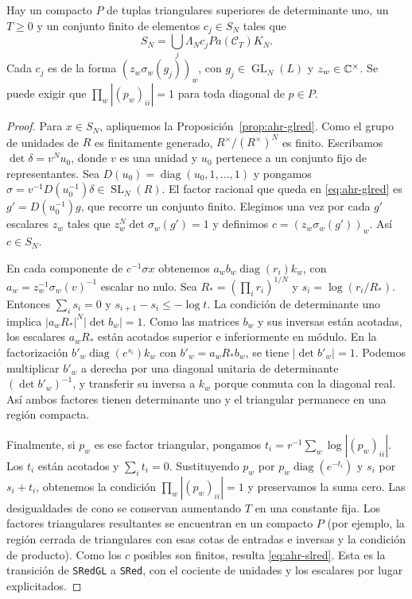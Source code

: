 \begin{proposicion}
\label{prop:ahr-slred}
Hay un compacto $P$ de tuplas triangulares superiores de determinante uno, un $T\ge0$ y un conjunto finito de elementos $c_j\in S_N$ tales que
\begin{equation}
 S_N=\bigcup_j\Lambda_N c_j P a(\mathcal C_T)K_N.
 \label{eq:ahr-slred}
\end{equation}
Cada $c_j$ es de la forma $(z_w\sigma_w(g_j))_w$, con $g_j\in\operatorname{GL}_N(L)$ y $z_w\in\mathbb{C}^\times$. Se puede exigir que $\prod_w|(p_w)_{ii}|=1$ para toda diagonal de $p\in P$.
\end{proposicion}
\begin{proof}
Para $x\in S_N$, apliquemos la Proposición~\ref{prop:ahr-glred}. Como el grupo de unidades de $R$ es finitamente generado, $R^\times/(R^\times)^N$ es finito. Escribamos $\det\delta=v^N u_0$, donde $v$ es una unidad y $u_0$ pertenece a un conjunto fijo de representantes. Sea $D(u_0)=\operatorname{diag}(u_0,1,\ldots,1)$ y pongamos $\sigma=v^{-1}D(u_0^{-1})\delta\in\operatorname{SL}_N(R)$. El factor racional que queda en \eqref{eq:ahr-glred} es $g'=D(u_0^{-1})g$, que recorre un conjunto finito. Elegimos una vez por cada $g'$ escalares $z_w$ tales que $z_w^N\det\sigma_w(g')=1$ y definimos $c=(z_w\sigma_w(g'))_w$. Así $c\in S_N$.

En cada componente de $c^{-1}\sigma x$ obtenemos $a_w b_w\operatorname{diag}(r_i)k_w$, con $a_w=z_w^{-1}\sigma_w(v)^{-1}$ escalar no nulo. Sea $R_*=(\prod_i r_i)^{1/N}$ y $s_i=\log(r_i/R_*)$. Entonces $\sum_i s_i=0$ y $s_{i+1}-s_i\le-\log t$. La condición de determinante uno implica $|a_wR_*|^N|\det b_w|=1$. Como las matrices $b_w$ y sus inversas están acotadas, los escalares $a_wR_*$ están acotados superior e inferiormente en módulo. En la factorización $b'_w\operatorname{diag}(e^{s_i})k_w$ con $b'_w=a_wR_*b_w$, se tiene $|\det b'_w|=1$. Podemos multiplicar $b'_w$ a derecha por una diagonal unitaria de determinante $(\det b'_w)^{-1}$, y transferir su inversa a $k_w$ porque conmuta con la diagonal real. Así ambos factores tienen determinante uno y el triangular permanece en una región compacta.

Finalmente, si $p_w$ es ese factor triangular, pongamos $t_i=r^{-1}\sum_w\log|(p_w)_{ii}|$. Los $t_i$ están acotados y $\sum_i t_i=0$. Sustituyendo $p_w$ por $p_w\operatorname{diag}(e^{-t_i})$ y $s_i$ por $s_i+t_i$, obtenemos la condición $\prod_w|(p_w)_{ii}|=1$ y preservamos la suma cero. Las desigualdades de cono se conservan aumentando $T$ en una constante fija. Los factores triangulares resultantes se encuentran en un compacto $P$ (por ejemplo, la región cerrada de triangulares con esas cotas de entradas e inversas y la condición de producto). Como los $c$ posibles son finitos, resulta \eqref{eq:ahr-slred}. Esta es la transición de \texttt{SRedGL} a \texttt{SRed}, con el cociente de unidades y los escalares por lugar explicitados.
\end{proof}

